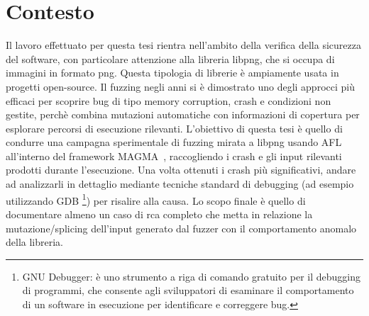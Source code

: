 \section{Contesto}
Il lavoro effettuato per questa tesi rientra nell'ambito della verifica della  sicurezza del software, con particolare attenzione alla libreria libpng, che si occupa di immagini in formato png. 
Questa tipologia di librerie è ampiamente usata in progetti open-source.
Il fuzzing negli anni si è dimostrato uno degli approcci più efficaci per scoprire bug di tipo memory corruption, crash e condizioni non gestite, perchè combina mutazioni automatiche con informazioni di copertura per esplorare percorsi di esecuzione rilevanti. %
L'obiettivo di questa tesi è quello di condurre una campagna sperimentale di fuzzing mirata a libpng usando AFL all'interno del framework MAGMA~\parencite{magma_fuzzer}, raccogliendo i crash e gli input rilevanti prodotti durante l'esecuzione.
Una volta ottenuti i crash più significativi, andare ad analizzarli in dettaglio mediante tecniche standard di debugging (ad esempio utilizzando GDB \footnote{GNU Debugger: è uno strumento a riga di comando gratuito per il debugging di programmi, che consente agli sviluppatori di esaminare il comportamento di un software in esecuzione per identificare e correggere bug.}) per risalire alla causa.
Lo scopo finale è quello di documentare almeno un caso di \gls{rca} completo che metta in relazione la mutazione/splicing dell'input generato dal fuzzer con il comportamento anomalo della libreria.

